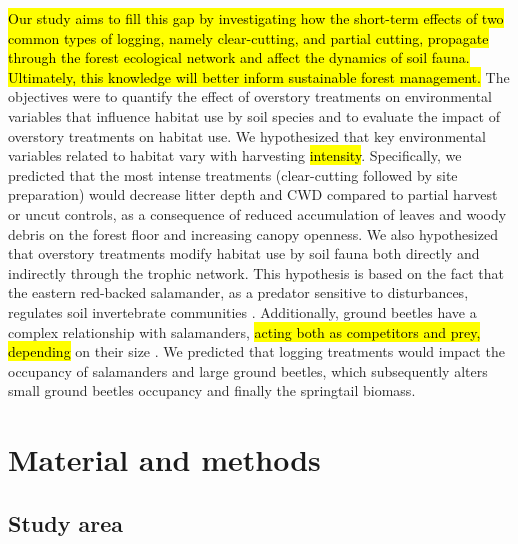 \hl{Our study aims to fill this gap by investigating how the short-term effects of two common types of logging, namely clear-cutting, and partial cutting, propagate through the forest ecological network and affect the dynamics of soil fauna. 
Ultimately, this knowledge will better inform sustainable forest management. }
The objectives were to quantify the effect of overstory treatments on environmental variables that influence habitat use by soil species 
and to evaluate the impact of overstory treatments on habitat use. 
We hypothesized that key environmental variables related to habitat vary with harvesting \hl{intensity}. 
Specifically, we predicted that the most intense treatments (clear-cutting followed by site preparation) would decrease litter depth and CWD compared to partial harvest or uncut controls, 
as a consequence of reduced accumulation of leaves and woody debris on the forest floor and increasing canopy openness. 
We also hypothesized that overstory treatments modify habitat use by soil fauna both directly and indirectly through the trophic network. 
This hypothesis is based on the fact that the eastern red-backed salamander, as a predator sensitive to disturbances, regulates soil invertebrate communities \citep{Wyman1998Experimentalassessment,MichaelWalton2005Salamandersforestfloor,Walton2006Salamandersforestfloor,Walton2013Topdownregulation,Hickerson2017Easternredbacked}. 
Additionally, ground beetles have a complex relationship with salamanders, \hl{acting both as competitors and prey, depending} on their size \citep{Jaeger1980MicrohabitatsTerrestrial,loveiEcologyBehaviorGround1996,Gall2003BehavioralInteractions}. 
We predicted that logging treatments would impact the occupancy of salamanders and large ground beetles, which subsequently alters small ground beetles occupancy and finally the springtail biomass. 


\section*{Material and methods}
\label{sec:matmet1}

\subsection*{Study area}
\label{subsec:area}

